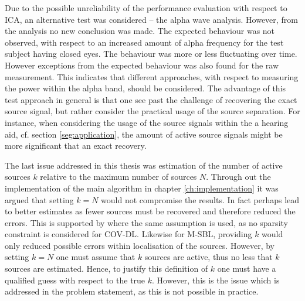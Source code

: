 Due to the possible unreliability of the performance evaluation with respect to ICA, an alternative test was considered -- the alpha wave analysis. 
However, from the analysis no new conclusion was made. The expected behaviour was not observed, with respect to an increased amount of alpha frequency for the test subject having closed eyes. 
The behaviour was more or less fluctuating over time. However exceptions from the expected behaviour was also found for the raw measurement. This indicates that different approaches, with respect to measuring the power within the alpha band, should be considered.
The advantage of this test approach in general is that one see past the challenge of recovering the exact source signal, but rather consider the practical usage of the source separation. For instance, when considering the usage of the source signals within the a hearing aid, cf. section \ref{seg:application}, the amount of active source signals might be more significant that an exact recovery.             

The last issue addressed in this thesis was estimation of the number of active sources $k$ relative to the maximum number of sources $N$. Through out the implementation of the main algorithm in chapter \ref{ch:implementation} it was argued that setting $k = N$ would not compromise the results. 
In fact perhaps lead to better estimates as fewer sources must be recovered and therefore reduced the errors.
This is supported by \cite{Balkan2015} where the same assumption is used, as no sparsity constraint is considered for COV-DL. 
Likewise for M-SBL, providing $k$ would only reduced possible errors within localisation of the sources.
However, by setting $k = N$ one must assume that $k$ sources are active, thus no less that $k$ sources are estimated. 
Hence, to justify this definition of $k$ one must have a qualified guess with respect to the true $k$. 
However, this is the issue which is addressed in the problem statement, as this is not possible in practice. 

